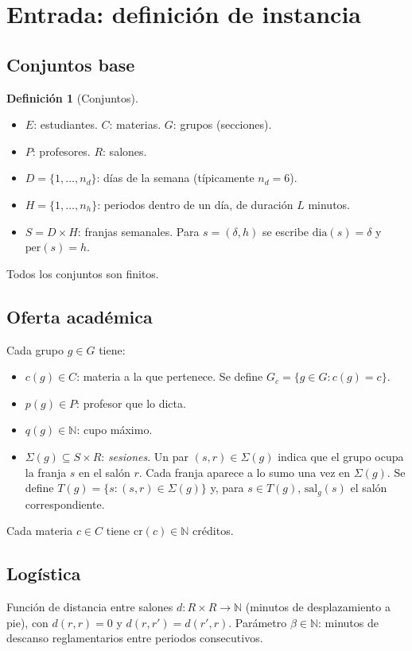 \documentclass[11pt,letterpaper]{article}
\theoremstyle{definition}
\newtheorem{definicion}{Definición}
\theoremstyle{remark}
\theoremstyle{plain}
\newcommand{\N}{\mathbb{N}}
\begin{document}
\section{Entrada: definición de instancia}

\subsection{Conjuntos base}
\begin{definicion}[Conjuntos]
\begin{itemize}[nosep]
  \item $E$: estudiantes. \quad $C$: materias. \quad $G$: grupos (secciones).
  \item $P$: profesores. \quad $R$: salones.
  \item $D=\{1,\dots,n_d\}$: días de la semana (típicamente $n_d=6$).
  \item $H=\{1,\dots,n_h\}$: periodos dentro de un día, de duración $L$ minutos.
  \item $S = D\times H$: franjas semanales. Para $s=(\delta,h)$ se escribe
        $\mathrm{dia}(s)=\delta$ y $\mathrm{per}(s)=h$.
\end{itemize}
Todos los conjuntos son finitos.
\end{definicion}

\subsection{Oferta académica}
Cada grupo $g\in G$ tiene:
\begin{itemize}[nosep]
  \item $c(g)\in C$: materia a la que pertenece. Se define $G_c=\{g\in G : c(g)=c\}$.
  \item $p(g)\in P$: profesor que lo dicta.
  \item $q(g)\in\N$: cupo máximo.
  \item $\Sigma(g)\subseteq S\times R$: \emph{sesiones}. Un par $(s,r)\in\Sigma(g)$
        indica que el grupo ocupa la franja $s$ en el salón $r$. Cada franja
        aparece a lo sumo una vez en $\Sigma(g)$. Se define
        $T(g)=\{s : (s,r)\in\Sigma(g)\}$ y, para $s\in T(g)$, $\mathrm{sal}_g(s)$
        el salón correspondiente.
\end{itemize}
Cada materia $c\in C$ tiene $\mathrm{cr}(c)\in\N$ créditos.

\subsection{Logística}
Función de distancia entre salones $d:R\times R\to\N$ (minutos de
desplazamiento a pie), con $d(r,r)=0$ y $d(r,r')=d(r',r)$. Parámetro
$\beta\in\N$: minutos de descanso reglamentarios entre periodos consecutivos.
\end{document}
